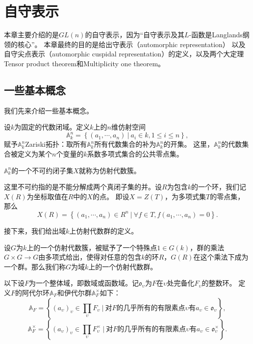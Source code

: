 

\chapter{自守表示}
\label{cha:china}
  本章主要介绍的是$GL(n)$的自守表示，因为“自守表示及其$L$-函数是Langlands纲领的核心”。
  本章最终的目的是给出守表示（automorphic representation）
  以及自守尖点表示（automorphic cuspidal
  representation）的定义，以及两个大定理Tensor product
  theorem和Multiplicity one theorem。
\section{一些基本概念}
  我们先来介绍一些基本概念。

  设$k$为固定的代数闭域。定义$k$上的$n$维仿射空间
  $$\mathbb{A}_k^n = \left\{(a_1, \cdots, a_n)\ |\ a_i\in k, 1\leqslant i\leqslant
  n\right\},$$
  赋予$\mathbb{A}_k^n$Zariski拓扑：取所有$\mathbb{A}_k^n$所有代数集合的补为$\mathbb{A}_k^n$的开集。
  这里，$\mathbb{A}_k^n$的代数集合被定义为某个$n$个变量的$k$系数多项式集合的公共零点集。
  \begin{definition}
  $\mathbb{A}_k^n$的一个不可约闭子集$X$就称为仿射代数簇。
  \end{definition}
  这里不可约指的是不能分解成两个真闭子集的并。设$R$为包含$k$的一个环，我们记$X(R)$为坐标取值在$R$中的$X$的点。
  即设$X=Z(T)$，为多项式集$T$的零点集，那么$$X(R) = \left\{(a_1, \cdots, a_n)\in R^n\ |\ \forall f\in T, f(a_1, \cdots,
  a_n) = 0 \right\}.$$

  接下来，我们给出域$k$上仿射代数群的定义。
  \begin{definition}
  设$G$为$k$上的一个仿射代数簇，被赋予了一个特殊点$1\in G(k)$，群的乘法$G\times G\rightarrow
  G$由多项式给出，使得对任意的包含$k$的环$R$，$G(R)$在这个乘法下成为一个群。那么我们称$G$为域$k$上的一个仿射代数群。
  \end{definition}

  以下设$F$为一个整体域，即数域或函数域。记$\mathfrak{o}_{\upsilon}$为$F$在$\upsilon$处完备化$F_{\upsilon}$的整数环。
  定义$F$的阿代尔环$\mathbb{A}_F$和伊代尔群$\mathbb{A}_F^{\times}$如下：
  $$\mathbb{A}_F = \left\{(a_{\upsilon})_{\upsilon}\in \prod\limits_{\upsilon} F_{\upsilon}\
  |\ \text{对$F$的几乎所有的有限素点$\upsilon$有} a_{\upsilon}\in
  \mathfrak{o}_{\upsilon} \right\},$$
  $$\mathbb{A}_F^{\times} = \left\{(a_{\upsilon})_{\upsilon}\in \prod\limits_{\upsilon} F_{\upsilon}^{\times}\
  |\ \text{对$F$的几乎所有的有限素点$\upsilon$有} a_{\upsilon}\in
  \mathfrak{o}_{\upsilon}^{\times} \right\}.$$

